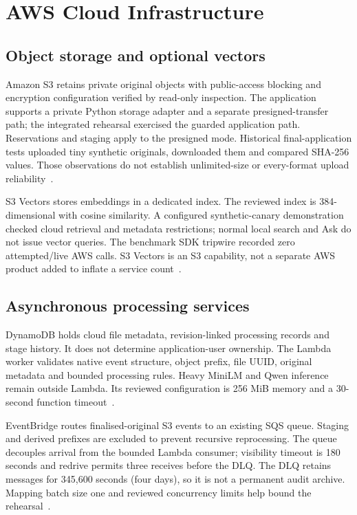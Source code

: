 \chapter{AWS Cloud Infrastructure}
\section{Object storage and optional vectors}
Amazon S3 retains private original objects with public-access blocking and encryption configuration verified by read-only inspection. The application supports a private Python storage adapter and a separate presigned-transfer path; the integrated rehearsal exercised the guarded application path. Reservations and staging apply to the presigned mode. Historical final-application tests uploaded tiny synthetic originals, downloaded them and compared SHA-256 values. Those observations do not establish unlimited-size or every-format upload reliability~\cite{s3}.

S3 Vectors stores embeddings in a dedicated index. The reviewed index is 384-dimensional with cosine similarity. A configured synthetic-canary demonstration checked cloud retrieval and metadata restrictions; normal local search and Ask do not issue vector queries. The benchmark SDK tripwire recorded zero attempted/live AWS calls. S3 Vectors is an S3 capability, not a separate AWS product added to inflate a service count~\cite{s3vectors}.
\section{Asynchronous processing services}
DynamoDB holds cloud file metadata, revision-linked processing records and stage history. It does not determine application-user ownership. The Lambda worker validates native event structure, object prefix, file UUID, original metadata and bounded processing rules. Heavy MiniLM and Qwen inference remain outside Lambda. Its reviewed configuration is 256 MiB memory and a 30-second function timeout~\cite{dynamodb,lambda}.

EventBridge routes finalised-original S3 events to an existing SQS queue. Staging and derived prefixes are excluded to prevent recursive reprocessing. The queue decouples arrival from the bounded Lambda consumer; visibility timeout is 180 seconds and redrive permits three receives before the DLQ. The DLQ retains messages for 345,600 seconds (four days), so it is not a permanent audit archive. Mapping batch size one and reviewed concurrency limits help bound the rehearsal~\cite{eventbridge,sqs}.

